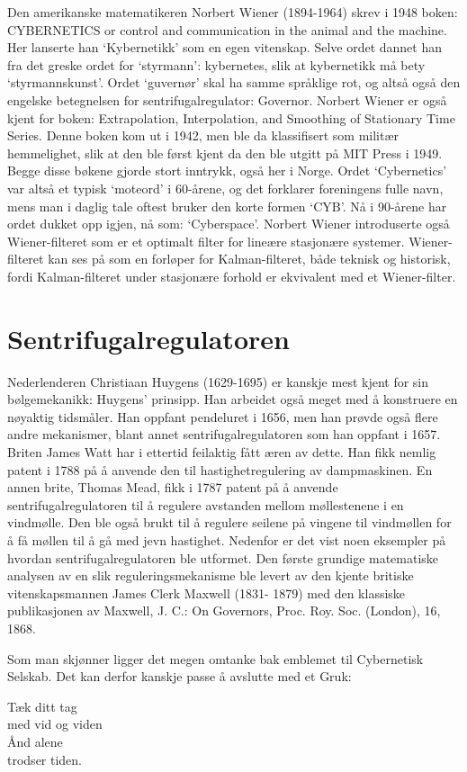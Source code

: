 \documentclass[../../main.tex]{subfiles}
\begin{document}
Den amerikanske matematikeren Norbert Wiener (1894-1964) skrev i 1948 boken: CYBERNETICS or control and communication in the animal and the machine. Her lanserte han `Kybernetikk' som en egen vitenskap. Selve ordet dannet han fra det greske ordet for `styrmann': kybernetes, slik at kybernetikk må bety `styrmannskunst'. Ordet `guvernør' skal ha samme språklige rot, og altså også den engelske betegnelsen for sentrifugalregulator: Governor. Norbert Wiener er også kjent for boken: Extrapolation, Interpolation, and Smoothing of Stationary Time Series. Denne boken kom ut i 1942, men ble da klassifisert som militær hemmelighet, slik at den ble først kjent da den ble utgitt på MIT Press i 1949. Begge disse bøkene gjorde stort inntrykk, også her i Norge. Ordet `Cybernetics' var altså et typisk `moteord' i 60-årene, og det forklarer foreningens fulle navn, mens man i daglig tale oftest bruker den korte formen `CYB'. Nå i 90-årene har ordet dukket opp igjen, nå som: `Cyberspace'. Norbert Wiener introduserte også Wiener-filteret som er et optimalt filter for lineære stasjonære systemer. Wiener-filteret kan ses på som en forløper for Kalman-filteret, både teknisk og historisk, fordi Kalman-filteret under stasjonære forhold er ekvivalent med et Wiener-filter.

\section{Sentrifugalregulatoren}

Nederlenderen Christiaan Huygens (1629-1695) er kanskje mest kjent for sin bølgemekanikk: Huygens' prinsipp. Han arbeidet også meget med å konstruere en nøyaktig tidsmåler. Han oppfant pendeluret i 1656, men han prøvde også flere andre mekanismer, blant annet sentrifugalregulatoren som han oppfant i 1657. Briten James Watt har i ettertid feilaktig fått æren av dette. Han fikk nemlig patent i 1788 på å anvende den til hastighetregulering av dampmaskinen. En annen brite, Thomas Mead, fikk i 1787 patent på å anvende sentrifugalregulatoren til å regulere avstanden mellom møllestenene i en vindmølle. Den ble også brukt til å regulere seilene på vingene til vindmøllen for å få møllen til å gå med jevn hastighet. Nedenfor er det vist noen eksempler på hvordan sentrifugalregulatoren ble utformet. Den første grundige matematiske analysen av en slik reguleringsmekanisme ble levert av den kjente britiske vitenskapsmannen James Clerk Maxwell (1831- 1879) med den klassiske publikasjonen av Maxwell, J. C.: On Governors, Proc. Roy. Soc. (London), 16, 1868.


Som man skjønner ligger det megen omtanke bak emblemet til Cybernetisk Selskab. Det kan derfor kanskje passe å avslutte med et Gruk:

\begin{center}
Tæk ditt tag\\
med vid og viden\\
Ånd alene\\
trodser tiden.
\end{center}
\end{document}
